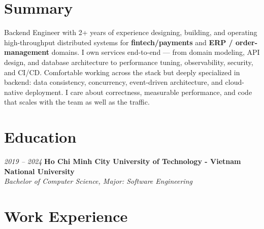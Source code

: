 \section{Summary}
\begin{onecolentry}
    Backend Engineer with 2+ years of experience designing, building, and operating high-throughput distributed systems for \textbf{fintech/payments} and \textbf{ERP / order-management} domains. I own services end-to-end — from domain modeling, API design, and database architecture to performance tuning, observability, security, and CI/CD. Comfortable working across the stack but deeply specialized in backend: data consistency, concurrency, event-driven architecture, and cloud-native deployment. I care about correctness, measurable performance, and code that scales with the team as well as the traffic.
\end{onecolentry}


\section{Education}
\begin{twocolentry}{\textit{2019 -- 2024}}
    \textbf{Ho Chi Minh City University of Technology - Vietnam National University}\\[4pt]
    \textit{Bachelor of Computer Science, Major: Software Engineering}
\end{twocolentry}


\section{Work Experience}

